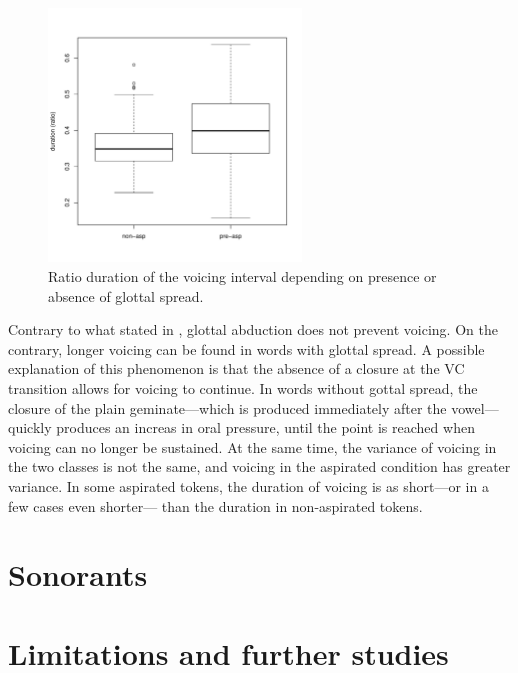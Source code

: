 \documentclass[11pt,a4paper,openany]{memoir}\usepackage[]{graphicx}\usepackage[]{color}
\newenvironment{knitrout}{}{} %
\begin{document}
\begin{figure}
\centering
\begin{knitrout}
\color{fgcolor}
\includegraphics[width=0.6\textwidth]{img/voic-stop-1} 

\end{knitrout}
\caption{Ratio duration of the voicing interval depending on presence or absence of glottal spread.}
\label{f:voicdur}
\end{figure}

Contrary to what stated in , glottal abduction does not prevent voicing.
On the contrary, longer voicing can be found in words with glottal spread.
A possible explanation of this phenomenon is that the absence of a closure at the VC transition allows for voicing to continue.
In words without gottal spread, the closure of the plain geminate---which is produced immediately after the vowel---quickly produces an increas in oral pressure, until the point is reached when voicing can no longer be sustained.
At the same time, the variance of voicing in the two classes is not the same, and voicing in the aspirated condition has greater variance.
In some aspirated tokens, the duration of voicing is as short---or in a few cases even shorter--- than the duration in non-aspirated tokens.

\section{Sonorants}




\section{Limitations and further studies}
\end{document}
